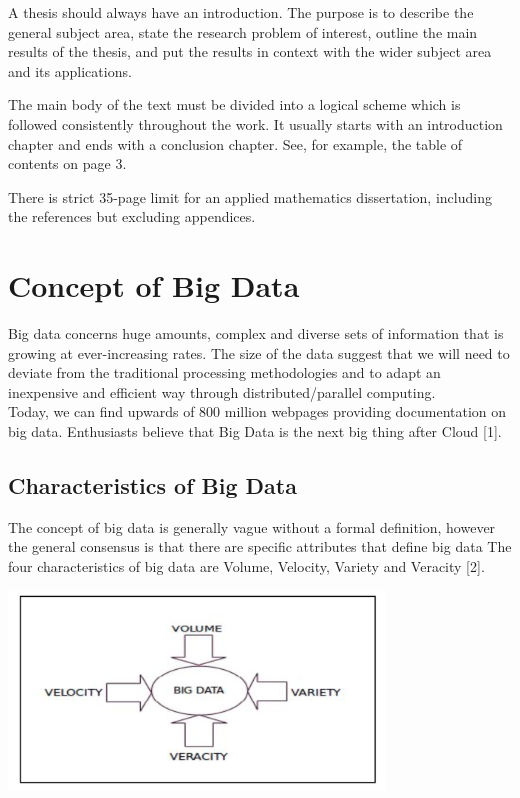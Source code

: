 \documentclass[11pt]{book}
\begin{document}
A thesis should always have an introduction.  The purpose is to describe the general subject area, state the research problem of interest, outline the main results of the thesis, and put the results in context with the wider subject area and its applications.

The main body of the text must be divided into a logical scheme which  is followed consistently throughout the work.  
 It usually starts with an introduction chapter  and ends with  a conclusion chapter. See, for example, the table of contents on page 3. 

There is strict  35-page limit  for an applied mathematics dissertation,  including  the references  but excluding  appendices. 

\chapter{Concept of Big Data}

Big data concerns huge amounts, complex and diverse sets of information that is growing at ever-increasing rates. The size of the data suggest that we will need to deviate from the traditional processing methodologies and to adapt an inexpensive and efficient way through distributed/parallel computing.\\

Today, we can find upwards of 800 million webpages providing documentation on big data. Enthusiasts believe that Big Data is the next big thing after Cloud [1]. 

\section{Characteristics of Big Data}

The concept of big data is generally vague without a formal definition, however the general consensus is that there are specific attributes that define big data The four characteristics of big data are Volume, Velocity, Variety and Veracity [2]. 

\begin{center}
\includegraphics[width=10cm]{4vbd}\\
\end{center}
\end{document}
